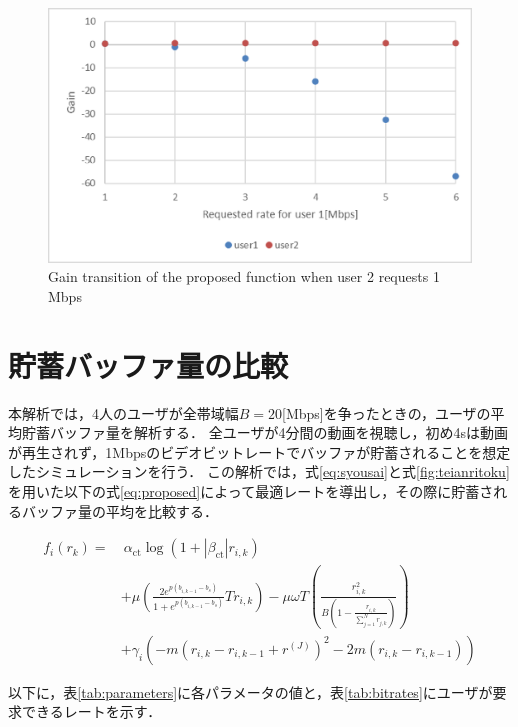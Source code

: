 \begin{figure}[bp]
  \centering
  \includegraphics[scale=0.45]{teian.eps}
            {Gain transition of the proposed function when user 2 requests 1 Mbps}
    \label{fig:teianritoku}
\end{figure}


\section{貯蓄バッファ量の比較}

本解析では，4人のユーザが全帯域幅$B = 20$[Mbps]を争ったときの，ユーザの平均貯蓄バッファ量を解析する．
全ユーザが4分間の動画を視聴し，初め4sは動画が再生されず，1Mbpsのビデオビットレートでバッファが貯蓄されることを想定したシミュレーションを行う．
この解析では，式\eqref{eq:syousai}と式\eqref{fig:teianritoku}を用いた以下の式\eqref{eq:proposed}によって最適レートを導出し，その際に貯蓄されるバッファ量の平均を比較する．

\begin{equation}
\begin{split}
  f_i(r_k) = &\ \alpha_{\text{ct}} \log(1 + |\beta_{\text{ct}}| r_{i,k}) \\
  &+ \mu \left( \frac{2 e^{p(b_{i,k-1} - b_s)}}{1 + e^{p(b_{i,k-1} - b_s)}} T r_{i,k} \right) - \mu \omega T \left(\frac{r_{i,k}^2}{B\left(1-\frac{r_{i,k}}{\sum^N_{j=1}r_{j,k}}\right)}\right) \\
  &+ \gamma_i \left( -m(r_{i,k} - r_{i,k-1} + r^{(J)})^2 - 2m(r_{i,k} - r_{i,k-1}) \right)
  \label{eq:proposed}
\end{split}
\end{equation}

以下に，表\ref{tab:parameters}に各パラメータの値と，表\ref{tab:bitrates}にユーザが要求できるレートを示す．

